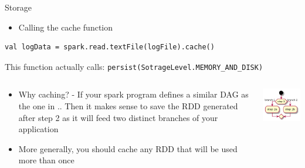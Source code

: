 \documentclass[presentation, aspectratio=169]{beamer}
\begin{document}
\begin{frame}[label={sec:org1fa974b},fragile]{Storage}
 \begin{itemize}
\item Calling the cache function
\end{itemize}
\begin{verbatim}
val logData = spark.read.textFile(logFile).cache()
\end{verbatim}
This function actually calls: \texttt{persist(SotrageLevel.MEMORY\_AND\_DISK)}



\begin{columns}
\begin{column}{0.5\columnwidth}
\begin{itemize}
\item \alert{Why caching?} - If your spark program defines a similar DAG as the one in ..
Then it makes sense to save the RDD generated after step 2 as it will feed 
two distinct branches of your application
\item More generally, you should cache any RDD that will be used more than once
\end{itemize}
\end{column}

\begin{column}{0.5\columnwidth}
\begin{center}
\includegraphics[width=.9\linewidth]{dag.png}
\end{center}
\end{column}
\end{columns}
\end{frame}
\end{document}
